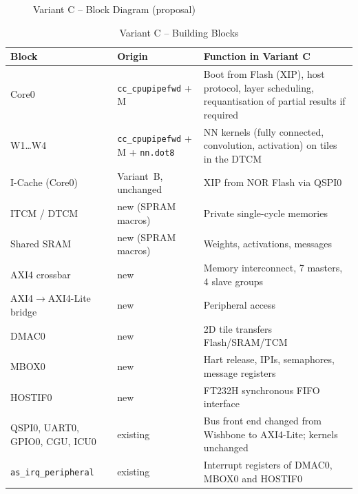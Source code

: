 \begin{figure}[H]
{}
\caption{Variant C -- Block Diagram (proposal)}
\label{fig:mcnnblock}
\end{figure}

\begin{table}[H]
\caption{Variant C -- Building Blocks}
\label{tab:mcnnblocks}
\centering
{\footnotesize
\begin{tabularx}{\textwidth}{|p{} |p{} |X|}
  \hline
  Block & Origin & Function in Variant C \\
  \hline
  \hline
  Core0 & \texttt{cc\_cpupipefwd} + M & Boot from Flash (XIP), host protocol,
    layer scheduling, requantisation of partial results if required \\
  \hline
  W1\ldots W4 & \texttt{cc\_cpupipefwd} + M + \texttt{nn.dot8} &
    NN kernels (fully connected, convolution, activation) on tiles in the DTCM \\
  \hline
  I-Cache (Core0) & Variant~B, unchanged & XIP from NOR Flash via QSPI0 \\
  \hline
  ITCM / DTCM & new (SPRAM macros) & Private single-cycle memories \\
  \hline
  Shared SRAM & new (SPRAM macros) & Weights, activations, messages \\
  \hline
  AXI4 crossbar & new & Memory interconnect, 7 masters, 4 slave groups \\
  \hline
  AXI4$\rightarrow$AXI4-Lite bridge & new & Peripheral access \\
  \hline
  DMAC0 & new & 2D tile transfers Flash/SRAM/TCM \\
  \hline
  MBOX0 & new & Hart release, IPIs, semaphores, message registers \\
  \hline
  HOSTIF0 & new & FT232H synchronous FIFO interface \\
  \hline
  QSPI0, UART0, GPIO0, CGU, ICU0 & existing & Bus front end changed from
    Wishbone to AXI4-Lite; kernels unchanged \\
  \hline
  \texttt{as\_irq\_peripheral} & existing & Interrupt registers of DMAC0,
    MBOX0 and HOSTIF0 \\
  \hline
\end{tabularx}}
\end{table}

